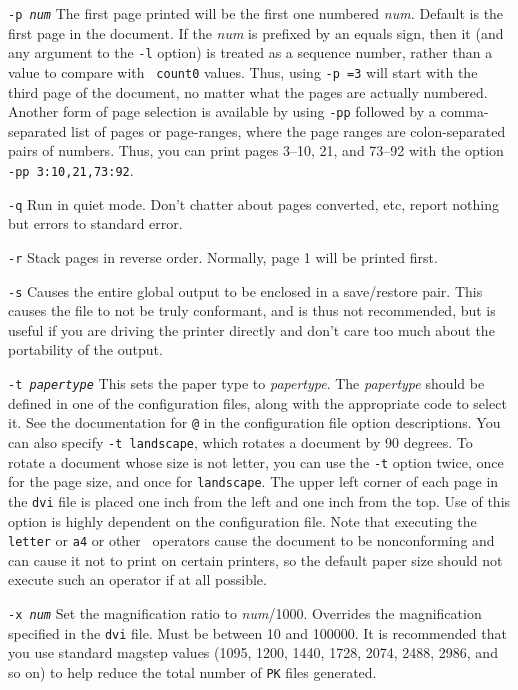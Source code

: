 \begin{list}
\item [\tt -p \em num]
The first page printed will be the first one numbered {\it num.}
Default is the first page in the document.  If the {\it num} is
prefixed by an equals sign, then it (and any argument to the {\tt -l}
option) is treated as a sequence number, rather than a value to
compare with {\tt {} count0} values.  Thus, using {\tt -p =3}
will start with the third page of the document, no matter what the
pages are actually numbered.  Another form of page selection is
available by using {\tt -pp} followed by a comma-separated list of
pages or page-ranges, where the page ranges are colon-separated pairs
of numbers.  Thus, you can print pages 3--10, 21, and 73--92 with the
option {\tt -pp 3:10,21,73:92}.

\item [\tt -q] Run in quiet mode.
Don't chatter about pages converted, etc,  report nothing but errors to
standard error.

\item [\tt -r]
Stack pages in reverse order.  Normally, page 1 will be printed first.

\item [\tt -s]
Causes the entire global output to be enclosed in a save/restore pair.
This causes the file to not be truly conformant, and is thus not recommended,
but is useful if you are driving the printer directly and don't care too
much about the portability of the output.

\item [\tt -t \em papertype] 
This sets the paper type to {\it papertype}.  The {\it papertype} should
be defined in one of the configuration files, along with the appropriate
code to select it.  See the documentation for {\tt @} in the configuration
file option descriptions.  You can also specify
{\tt -t landscape}, which rotates a document by 90 degrees.
To rotate a document whose size is not letter, you can use the 
{\tt -t} option twice, once for the page size, and once for {\tt landscape}.
The upper left corner of each page in
the {\tt dvi} file is placed one inch from the left and one inch from the top.
Use of this option is highly dependent on the configuration file.
Note that executing the {\tt letter} or {\tt a4} or other \PS\
operators cause the document to be nonconforming and can cause it not
to print on certain printers, so the default paper size should not
execute such an operator if at all possible.

\item [\tt -x \em num]
Set the magnification ratio to {\it num}/1000. Overrides the magnification
specified in the {\tt dvi} file.  Must be between 10 and 100000.  It is
recommended that you use standard magstep values (1095, 1200, 1440, 1728,
2074, 2488, 2986, and so on) to help reduce the total number of {\tt PK}
files generated.


\end{list}
